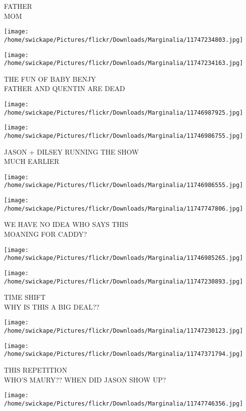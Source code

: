 \documentclass[10pt,letterpaper]{article}
\begin{document}
FATHER\\
MOM
\pagebreak

\texttt{[image: /home/swickape/Pictures/flickr/Downloads/Marginalia/11747234803.jpg]}

\vspace{0.25in}
\texttt{[image: /home/swickape/Pictures/flickr/Downloads/Marginalia/11747234163.jpg]}

THE FUN OF BABY BENJY\\
FATHER AND QUENTIN ARE DEAD
\pagebreak

\texttt{[image: /home/swickape/Pictures/flickr/Downloads/Marginalia/11746987925.jpg]}

\vspace{0.25in}
\texttt{[image: /home/swickape/Pictures/flickr/Downloads/Marginalia/11746986755.jpg]}

JASON + DILSEY RUNNING THE SHOW\\
MUCH EARLIER
\pagebreak

\texttt{[image: /home/swickape/Pictures/flickr/Downloads/Marginalia/11746986555.jpg]}

\vspace{0.25in}
\texttt{[image: /home/swickape/Pictures/flickr/Downloads/Marginalia/11747747806.jpg]}

WE HAVE NO IDEA WHO SAYS THIS\\
MOANING FOR CADDY?
\pagebreak

\texttt{[image: /home/swickape/Pictures/flickr/Downloads/Marginalia/11746985265.jpg]}

\vspace{0.25in}
\texttt{[image: /home/swickape/Pictures/flickr/Downloads/Marginalia/11747230893.jpg]}

TIME SHIFT\\
WHY IS THIS A BIG DEAL??
\pagebreak

\texttt{[image: /home/swickape/Pictures/flickr/Downloads/Marginalia/11747230123.jpg]}

\vspace{0.25in}
\texttt{[image: /home/swickape/Pictures/flickr/Downloads/Marginalia/11747371794.jpg]}

THIS REPETITION\\
WHO'S MAURY?? WHEN DID JASON SHOW UP?
\pagebreak

\texttt{[image: /home/swickape/Pictures/flickr/Downloads/Marginalia/11747746356.jpg]}
\end{document}
